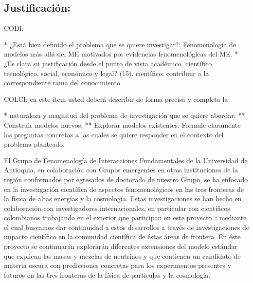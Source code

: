\subsection{Justificación:                                 }
\begin{instrucciones}
  CODI: 

  * ¿Está bien definido el problema que se quiere investigar?:
  Fenomenología de modelos más allá del ME motivados por evidencias
  fenomenológicas del ME.  
  * ¿Es clara su justificación desde el punto de vista académico,
  científico, tecnológico, social, económico y legal? (15).
  científico: contribuir a la correspondiente rama del conocimiento

  COLCI: en este ítem usted deberá describir de forma precisa y completa la
  
  * naturaleza y magnitud del problema de investigación que se quiere
  abordar:
  ** Construir modelos nuevos.
  ** Explorar modelos existentes.
  Formule claramente las preguntas concretas a las cuales se
  quiere responder en el contexto del problema planteado.
\end{instrucciones}
El Grupo de Fenomenología de Interacciones Fundamentales de la
Universidad de Antioquia, en colaboración con Grupos emergentes en
otras instituciones de la región conformados por egresados de
doctorado de nuestro Grupo, se ha enfocado en la investigación
científica de aspectos fenomenológicos en las tres fronteras de la
física de altas energías y la cosmología. Estas investigaciones se han
hecho en colaboración con investigadores internacionales, en
particular con científicos colombianos trabajando en el exterior que
participan en este
proyecto~\cite{Sierra:2009zq,Sierra:2008wj,AristizabalSierra:2008ye,Choi:2010jt,AristizabalSierra:2009bh,};
mediante el cual buscamos dar continuidad a estos desarrollos a través
de investigaciones de impacto científico en la comunidad científica de
éstas áreas de frontera. En éste proyecto se continuarán explorarán
diferentes extensiones del modelo estándar que explican las masas y
mezclas de neutrinos y que contienen un candidato de materia oscura
con predicciones concretas para los experimentos presentes y futuros
en las tres fronteras de la física de partículas y la cosmología. 



